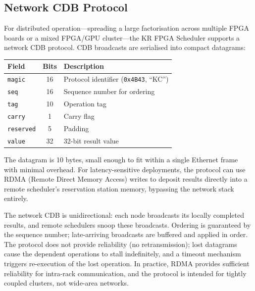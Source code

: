\documentclass[11pt,a4paper]{article}
\begin{document}
\subsection{Network CDB Protocol}
\label{sec:network-cdb}

For distributed operation---spreading a large factorisation across
multiple FPGA boards or a mixed FPGA/GPU cluster---the KR FPGA Scheduler
supports a network CDB protocol.  CDB broadcasts are serialised into
compact datagrams:

\begin{center}
\begin{tabular}{@{}lcl@{}}
\toprule
Field & Bits & Description \\
\midrule
\texttt{magic}       & 16 & Protocol identifier (\texttt{0x4B43}, ``KC'') \\
\texttt{seq}         & 16 & Sequence number for ordering \\
\texttt{tag}         & 10 & Operation tag \\
\texttt{carry}       & 1  & Carry flag \\
\texttt{reserved}    & 5  & Padding \\
\texttt{value}       & 32 & 32-bit result value \\
\bottomrule
\end{tabular}
\end{center}

The datagram is 10 bytes, small enough to fit within a single Ethernet
frame with minimal overhead.  For latency-sensitive deployments, the protocol
can use RDMA (Remote Direct Memory Access) writes to deposit results directly
into a remote scheduler's reservation station memory, bypassing the network
stack entirely.

The network CDB is unidirectional: each node broadcasts its locally completed
results, and remote schedulers snoop these broadcasts.  Ordering is guaranteed
by the sequence number; late-arriving broadcasts are buffered and applied in
order.  The protocol does not provide reliability (no retransmission); lost
datagrams cause the dependent operations to stall indefinitely, and a timeout
mechanism triggers re-execution of the lost operation.  In practice, RDMA
provides sufficient reliability for intra-rack communication, and the protocol
is intended for tightly coupled clusters, not wide-area networks.
\end{document}

